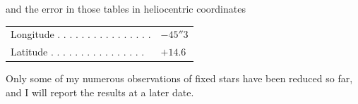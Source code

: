 \noindent and the error in those tables in heliocentric coordinates

\begin{center}
\begin{tabular}{ll}
Longitude . . . . . . . . . . . . . . . . & $-45''3$ \\
Latitude . . . . . . . . . . . . . . . . & $+14.6$ \\
\end{tabular}
\end{center}

\par\indent Only some of my numerous observations of fixed stars have been reduced so far, and I will report the results at a later date.
